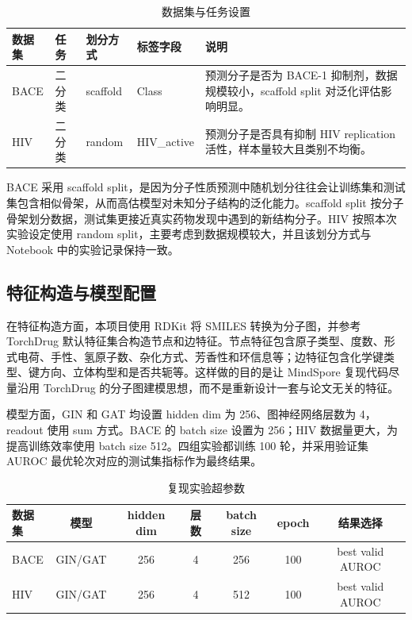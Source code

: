 \documentclass[12pt,hyperref,a4paper,UTF8]{ctexart}
\begin{document}
\begin{table}[H]
  \centering
  \caption{数据集与任务设置}
  \label{tab:dataset}
  \begin{tabular}{@{}p{}p{}p{}p{}p{}@{}}
    \toprule
    数据集 & 任务 & 划分方式 & 标签字段 & 说明\\
    \midrule
    BACE & 二分类 & scaffold & Class & 预测分子是否为 BACE-1 抑制剂，数据规模较小，scaffold split 对泛化评估影响明显。\\
    HIV & 二分类 & random & HIV\_active & 预测分子是否具有抑制 HIV replication 活性，样本量较大且类别不均衡。\\
    \bottomrule
  \end{tabular}
\end{table}

BACE 采用 scaffold split，是因为分子性质预测中随机划分往往会让训练集和测试集包含相似骨架，从而高估模型对未知分子结构的泛化能力。scaffold split 按分子骨架划分数据，测试集更接近真实药物发现中遇到的新结构分子。HIV 按照本次实验设定使用 random split，主要考虑到数据规模较大，并且该划分方式与 Notebook 中的实验记录保持一致。

\subsection{特征构造与模型配置}

在特征构造方面，本项目使用 RDKit 将 SMILES 转换为分子图，并参考 TorchDrug 默认特征集合构造节点和边特征。节点特征包含原子类型、度数、形式电荷、手性、氢原子数、杂化方式、芳香性和环信息等；边特征包含化学键类型、键方向、立体构型和是否共轭等。这样做的目的是让 MindSpore 复现代码尽量沿用 TorchDrug 的分子图建模思想，而不是重新设计一套与论文无关的特征。

模型方面，GIN 和 GAT 均设置 hidden dim 为 256、图神经网络层数为 4，readout 使用 sum 方式。BACE 的 batch size 设置为 256；HIV 数据量更大，为提高训练效率使用 batch size 512。四组实验都训练 100 轮，并采用验证集 AUROC 最优轮次对应的测试集指标作为最终结果。

\begin{table}[H]
  \centering
  \caption{复现实验超参数}
  \label{tab:hyper}
  \begin{tabular}{l c c c c c c}
    \toprule
    数据集 & 模型 & hidden dim & 层数 & batch size & epoch & 结果选择\\
    \midrule
    BACE & GIN/GAT & 256 & 4 & 256 & 100 & best valid AUROC\\
    HIV  & GIN/GAT & 256 & 4 & 512 & 100 & best valid AUROC\\
    \bottomrule
  \end{tabular}
\end{table}
\end{document}
